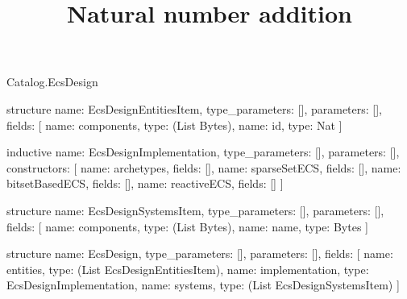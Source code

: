 \begin{lexlean}{Catalog.EcsDesign}
\title{Natural number addition}
\begin{semanticmodule}
structure{
  name: EcsDesignEntitiesItem,
  type_parameters: [],
  parameters: [],
  fields: [
    {name: components, type: (List Bytes)},
    {name: id, type: Nat}
  ]
}

inductive{
  name: EcsDesignImplementation,
  type_parameters: [],
  parameters: [],
  constructors: [
    {name: archetypes, fields: []},
    {name: sparseSetECS, fields: []},
    {name: bitsetBasedECS, fields: []},
    {name: reactiveECS, fields: []}
  ]
}

structure{
  name: EcsDesignSystemsItem,
  type_parameters: [],
  parameters: [],
  fields: [
    {name: components, type: (List Bytes)},
    {name: name, type: Bytes}
  ]
}

structure{
  name: EcsDesign,
  type_parameters: [],
  parameters: [],
  fields: [
    {name: entities, type: (List EcsDesignEntitiesItem)},
    {name: implementation, type: EcsDesignImplementation},
    {name: systems, type: (List EcsDesignSystemsItem)}
  ]
}
\end{semanticmodule}
\end{lexlean}
